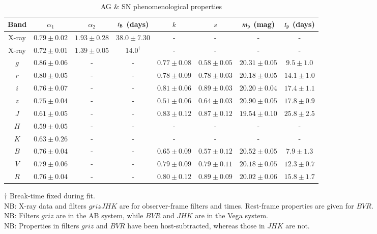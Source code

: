 \documentclass[traditabstract,longauth]{aa}
\begin{document}
\begin{table}
\centering
\setlength{\tabcolsep}{10.0pt}
\setlength{\extrarowheight}{3pt}
\caption{AG \& SN phenomenological properties}
\label{tableGRB_SN_obs_props}
\begin{tabular}{cccccccc}
\hline																					
Band	&	$\alpha_{1}$ & $\alpha_{2}$ & $t_{\rm B}$ (days) 	&	$k$	&	$s$	&	$m_{\rm p}$ (mag)	&	$t_{\rm p}$ (days)	\\
\hline
X-ray	&	$0.79\pm0.02$	&	$1.93\pm0.28$	&	$38.0\pm7.30$	&	-	&	-	&	-	&	-	\\
X-ray	&	$0.72\pm0.01$	&	$1.39\pm0.05$	&	$14.0^{\dagger}$	&	-	&	-	&	-	&	-	\\
$g$	&	$0.86\pm0.06$	&	-	&	-	&	$0.77\pm0.08$	&	$0.58\pm0.05$	&	$20.31\pm0.05$	&	$9.5\pm1.0$	\\
$r$	&	$0.80\pm0.05$	&	-	&	-	&	$0.78\pm0.09$	&	$0.78\pm0.03$	&	$20.18\pm0.05$	&	$14.1\pm1.0$	\\
$i$	&	$0.76\pm0.07$	&	-	&	-	&	$0.81\pm0.06$	&	$0.89\pm0.03$	&	$20.20\pm0.04$	&	$17.4\pm1.1$	\\
$z$	&	$0.75\pm0.04$	&	-	&	-	&	$0.51\pm0.06$	&	$0.64\pm0.03$	&	$20.90\pm0.05$	&	$17.8\pm0.9$	\\
$J$	&	$0.61\pm0.05$	&	-	&	-	&	$0.83\pm0.12$	&	$0.87\pm0.12$	&	$19.54\pm0.10$	&	$25.8\pm2.5$	\\
$H$	&	$0.59\pm0.05$	&	-	&	-	&	-	&	-	&	-	&	-	\\
$K$	&	$0.63\pm0.26$	&	-	&	-	&	-	&	-	&	-	&	-	\\
\hline															
$B$	&	$0.76\pm0.04$	&	-	&	-	&	$0.65\pm0.09$	&	$0.57\pm0.12$	&	$20.52\pm0.05$	&	$7.9\pm1.3$	\\
$V$	&	$0.79\pm0.06$	&	-	&	-	&	$0.79\pm0.09$	&	$0.79\pm0.11$	&	$20.18\pm0.05$	&	$12.3\pm0.7$	\\
$R$	&	$0.76\pm0.04$	&	-	&	-	&	$0.80\pm0.12$	&	$0.89\pm0.09$	&	$20.02\pm0.06$	&	$15.8\pm1.7$	\\
\hline																					
\end{tabular}
\begin{flushleft}
$\dagger$ Break-time fixed during fit.\\
NB: X-ray data and filters $grizJHK$ are for observer-frame filters and times. Rest-frame properties are given for $BVR$.\\
NB: Filters $griz$ are in the AB system, while $BVR$ and $JHK$ are in the Vega system.\\
NB: Properties in filters $griz$ and $BVR$ have been host-subtracted, whereas those in $JHK$ are not. \\
\end{flushleft}
\end{table}
\end{document}
